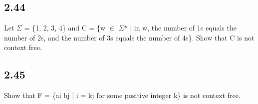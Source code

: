 \subsection*{2.44}

Let $\Sigma$ = \{1, 2, 3, 4\} and C = \{w $\in$ $\Sigma$$\ast$ | in w, the number of 1s equals the number of 2s, and the number of 3s equals the number of 4s\}. Show that C is not context free.


\subsection*{2.45}

Show that F = \{ai bj | i = kj for some positive integer k\} is not context free.


\clearpage
